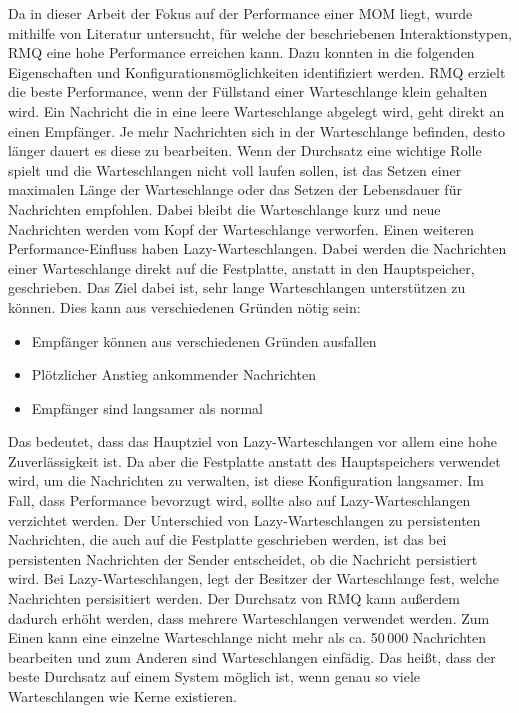 Da in dieser Arbeit der Fokus auf der Performance einer MOM liegt, wurde mithilfe von Literatur untersucht, für welche der beschriebenen Interaktionstypen, RMQ eine hohe Performance erreichen kann. Dazu konnten in \cite{rabbitmq} die folgenden Eigenschaften und Konfigurationsmöglichkeiten identifiziert werden. RMQ erzielt die beste Performance, wenn der Füllstand einer Warteschlange klein gehalten wird. Ein Nachricht die in eine leere Warteschlange abgelegt wird, geht direkt an einen Empfänger. Je mehr Nachrichten sich in der Warteschlange befinden, desto länger dauert es diese zu bearbeiten. Wenn der Durchsatz eine wichtige Rolle spielt und die Warteschlangen nicht voll laufen sollen, ist das Setzen einer maximalen Länge der Warteschlange oder das Setzen der Lebensdauer für Nachrichten empfohlen. Dabei bleibt die Warteschlange kurz und neue Nachrichten werden vom Kopf der Warteschlange verworfen. Einen weiteren Performance-Einfluss haben Lazy-Warteschlangen. Dabei werden die Nachrichten einer Warteschlange direkt auf die Festplatte, anstatt in den Hauptspeicher, geschrieben. Das Ziel dabei ist, sehr lange Warteschlangen unterstützen zu können. Dies kann aus verschiedenen Gründen nötig sein:
\begin{itemize}
    \item Empfänger können aus verschiedenen Gründen ausfallen
    \item Plötzlicher Anstieg ankommender Nachrichten
    \item Empfänger sind langsamer als normal
\end{itemize}
Das bedeutet, dass das Hauptziel von Lazy-Warteschlangen vor allem eine hohe Zuverlässigkeit ist. Da aber die Festplatte anstatt des Hauptspeichers verwendet wird, um die Nachrichten zu verwalten, ist diese Konfiguration langsamer. Im Fall, dass Performance bevorzugt wird, sollte also auf Lazy-Warteschlangen verzichtet werden. Der Unterschied von Lazy-Warteschlangen zu persistenten Nachrichten, die auch auf die Festplatte geschrieben werden, ist das bei persistenten Nachrichten der Sender entscheidet, ob die Nachricht persistiert wird. Bei Lazy-Warteschlangen, legt der Besitzer der Warteschlange fest, welche Nachrichten persisitiert werden. Der Durchsatz von RMQ kann außerdem dadurch erhöht werden, dass mehrere Warteschlangen verwendet werden. Zum Einen kann eine einzelne Warteschlange nicht mehr als ca. 50\,000 Nachrichten bearbeiten und zum Anderen sind Warteschlangen einfädig. Das heißt, dass der beste Durchsatz auf einem System möglich ist, wenn genau so viele Warteschlangen wie Kerne existieren. 

